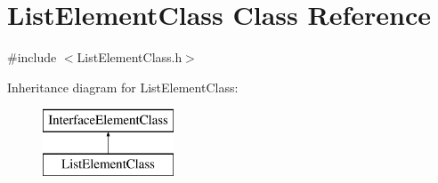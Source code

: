 \hypertarget{class_list_element_class}{}\section{List\+Element\+Class Class Reference}
\label{class_list_element_class}


{\ttfamily \#include $<$List\+Element\+Class.\+h$>$}

Inheritance diagram for List\+Element\+Class\+:\begin{figure}[H]
\begin{center}
\leavevmode
\includegraphics[height=2.000000cm]{class_list_element_class}
\end{center}
\end{figure}
